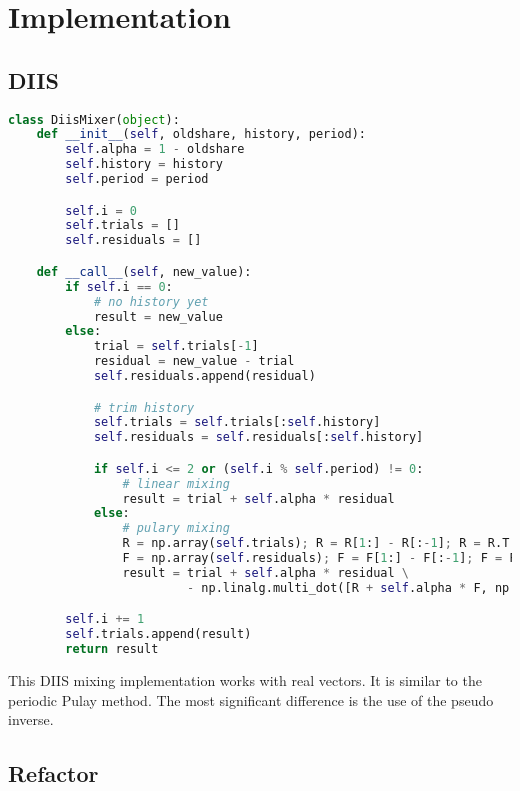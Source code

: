 \chapter{Implementation}
\label{ch:impl}

\section{DIIS}

\begin{lstlisting}[label=lst:diis, language=python, caption=DIIS implementation]
class DiisMixer(object):
    def __init__(self, oldshare, history, period):
        self.alpha = 1 - oldshare
        self.history = history
        self.period = period

        self.i = 0
        self.trials = []
        self.residuals = []

    def __call__(self, new_value):
        if self.i == 0:
            # no history yet
            result = new_value
        else:
            trial = self.trials[-1]
            residual = new_value - trial
            self.residuals.append(residual)

            # trim history
            self.trials = self.trials[:self.history]
            self.residuals = self.residuals[:self.history]

            if self.i <= 2 or (self.i % self.period) != 0:
                # linear mixing
                result = trial + self.alpha * residual
            else:
                # pulary mixing
                R = np.array(self.trials); R = R[1:] - R[:-1]; R = R.T
                F = np.array(self.residuals); F = F[1:] - F[:-1]; F = F.T
                result = trial + self.alpha * residual \
                         - np.linalg.multi_dot([R + self.alpha * F, np.linalg.pinv(F), residual])

        self.i += 1
        self.trials.append(result)
        return result
\end{lstlisting}

This DIIS mixing implementation works with real vectors. It is similar to the periodic Pulay method\cite{diis_periodic}. The most significant difference is the use of the pseudo inverse.

\section{Refactor}

